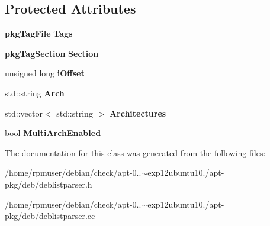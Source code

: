 \subsection*{\-Protected \-Attributes}
\begin{DoxyCompactItemize}
\item 
{\bf pkg\-Tag\-File} {\bfseries \-Tags}\label{classdebListParser_a56fb4a3ec342b9f491120135aa74923d}

\item 
{\bf pkg\-Tag\-Section} {\bfseries \-Section}\label{classdebListParser_a1826b1e33f5fa7e90d6ff86fea78e88b}

\item 
unsigned long {\bfseries i\-Offset}\label{classdebListParser_abfc00c1dd769d9b55665cbea01ed6cf3}

\item 
std\-::string {\bfseries \-Arch}\label{classdebListParser_ad2f7761f18ebac2e10b9aafca47806c0}

\item 
std\-::vector$<$ std\-::string $>$ {\bfseries \-Architectures}\label{classdebListParser_afd0b978645ca79fcb0653a0d3ecda7de}

\item 
bool {\bfseries \-Multi\-Arch\-Enabled}\label{classdebListParser_aad93bdcb19eb95fd0aaadadae2a67485}

\end{DoxyCompactItemize}


\-The documentation for this class was generated from the following files\-:\begin{DoxyCompactItemize}
\item 
/home/rpmuser/debian/check/apt-\/0..$\sim$exp12ubuntu10./apt-\/pkg/deb/deblistparser.\-h\item 
/home/rpmuser/debian/check/apt-\/0..$\sim$exp12ubuntu10./apt-\/pkg/deb/deblistparser.\-cc\end{DoxyCompactItemize}
